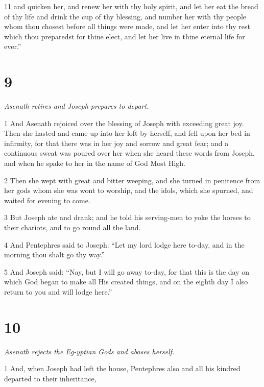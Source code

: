 \par 11 and quicken her, and renew her with thy holy spirit, 
and let her eat the bread of thy life and drink the cup of thy blessing, 
and number her with thy people whom thou chosest before all things were made, 
and let her enter into thy rest which thou preparedst for thine elect, 
and let her live in thine eternal life for ever.”

\chapter{9}

\par \textit{Asenath retires and Joseph prepares to depart.}

\par 1 And Asenath rejoiced over the blessing of Joseph with exceeding great joy. Then she hasted and came up into her loft by herself, and fell upon her bed in infirmity, for that there was in her joy and sorrow and great fear; and a continuous sweat was poured over her when she heard these words from Joseph, and when he spake to her in the name of God Most High. 

\par 2 Then she wept with great and bitter weeping, and she turned in penitence from her gods whom she was wont to worship, and the idols, which she spurned, and waited for evening to come. 

\par 3 But Joseph ate and drank; and he told his serving-men to yoke the horses to their chariots, and to go round all the land. 

\par 4 And Pentephres said to Joseph: “Let my lord lodge here to-day, and in the morning thou shalt go thy way.” 

\par 5 And Joseph said: “Nay, but I will go away to-day, for that this is the day on which God began to make all His created things, and on the eighth day I also return to you and will lodge here.”

\chapter{10}

\par \textit{Asenath rejects the Eg-yptian Gods and abases herself.}

\par 1 And, when Joseph had left the house, Pentephres also and all his kindred departed to their inheritance, 

